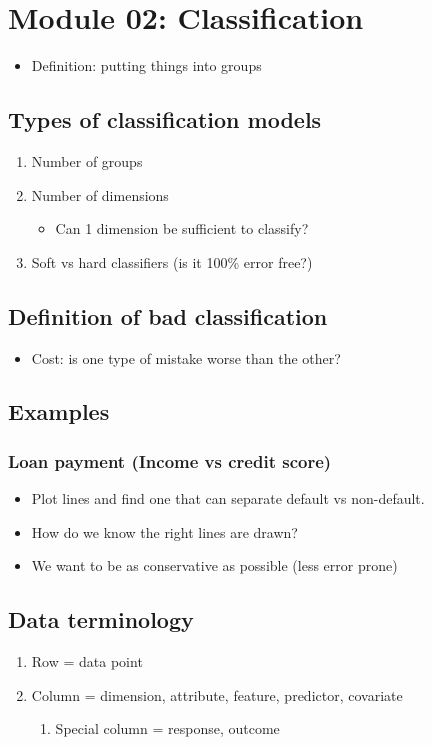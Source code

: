 \documentclass[11pt]{article}
\author{Wei Han Koh}
\date{\today}
\title{}
\begin{document}
\tableofcontents

\section{Module 02: Classification}
\label{sec:orge24e228}
\begin{itemize}
\item Definition: putting things into groups
\end{itemize}
\subsection{Types of classification models}
\label{sec:org854811f}
\begin{enumerate}
\item Number of groups
\item Number of dimensions
\begin{itemize}
\item Can 1 dimension be sufficient to classify?
\end{itemize}
\item Soft vs hard classifiers (is it 100\% error free?)
\end{enumerate}
\subsection{Definition of bad classification}
\label{sec:org659f76a}
\begin{itemize}
\item Cost: is one type of mistake worse than the other?
\end{itemize}

\subsection{Examples}
\label{sec:orga8c2b7f}
\subsubsection{Loan payment (Income vs credit score)}
\label{sec:org98a11c0}
\begin{itemize}
\item Plot lines and find one that can separate default vs non-default.
\item How do we know the right lines are drawn?
\item We want to be as conservative as possible (less error prone)
\end{itemize}
\subsection{Data terminology}
\label{sec:org636c224}
\begin{enumerate}
\item Row = data point
\item Column = dimension, attribute, feature, predictor, covariate
\begin{enumerate}
\item Special column = response, outcome
\end{enumerate}
\end{enumerate}
\end{document}
